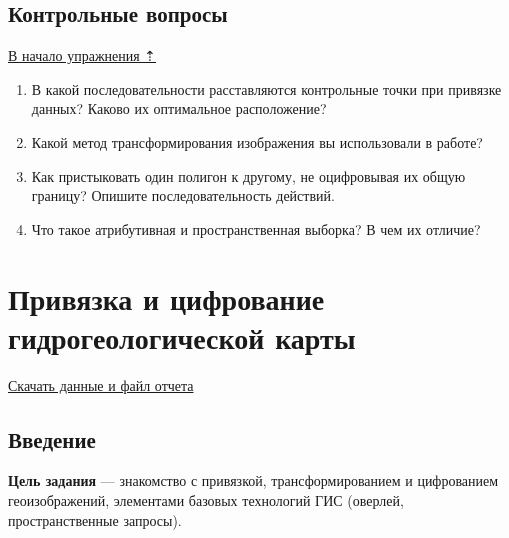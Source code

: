 \documentclass[]{book}
\theoremstyle{definition}
\theoremstyle{definition}
\theoremstyle{definition}
\theoremstyle{remark}
\begin{document}
\hypertarget{map-ref-general-questions}{%
\section{Контрольные вопросы}\label{map-ref-general-questions}}

\protect\hyperlink{map-ref-general}{В начало упражнения ⇡}

\begin{enumerate}
\def\labelenumi{\arabic{enumi}.}
\item
  В какой последовательности расставляются контрольные точки при
  привязке данных? Каково их оптимальное расположение?
\item
  Какой метод трансформирования изображения вы использовали в работе?
\item
  Как пристыковать один полигон к другому, не оцифровывая их общую
  границу? Опишите последовательность действий.
\item
  Что такое атрибутивная и пространственная выборка? В чем их отличие?
\end{enumerate}

\hypertarget{map-ref-hydrogeologic}{%
\chapter{Привязка и цифрование гидрогеологической
карты}\label{map-ref-hydrogeologic}}

\href{http://autolab.geogr.msu.ru/gis/data/Ex06.zip}{Скачать данные и
файл отчета}

\hypertarget{map-ref-hydrogeologic-intro}{%
\section{Введение}\label{map-ref-hydrogeologic-intro}}

\textbf{Цель задания} --- знакомство с привязкой, трансформированием и
цифрованием геоизображений, элементами базовых технологий ГИС (оверлей,
пространственные запросы).
\end{document}
